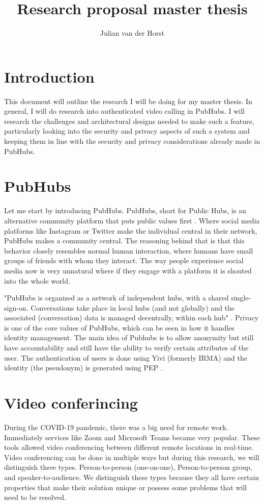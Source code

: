 \documentclass[11pt,a4paper]{article}
\title{Research proposal master thesis}
\author{Julian van der Horst}
\begin{document}
 
\maketitle
\section{Introduction}
This document will outline the research I will be doing for my master thesis. In general, I will do research into authenticated video calling in PubHubs. I will research the challenges and architectural designs needed to make such a feature, particularly looking into the security and privacy aspects of such a system and keeping them in line with the security and privacy considerations already made in PubHubs. 
\section{PubHubs}
Let me start by introducing PubHubs. PubHubs, short for Public Hubs, is an alternative community platform that puts public values first \cite{PH}. Where social media platforms like Instagram or Twitter make the individual central in their network, PubHubs makes a community central. The reasoning behind that is that this behavior closely resembles normal human interaction, where humans have small groups of friends with whom they interact. The way people experience social media now is very unnatural where if they engage with a platform it is shouted into the whole world.

"PubHubs is organized as a network of independent hubs, with a shared single-sign-on. Conversations take place in local hubs (and not globally) and the associated (conversation) data is managed decentrally, within each hub" \cite{PH}. Privacy is one of the core values of PubHubs, which can be seen in how it handles identity management. The main idea of Pubhubs is to allow anonymity but still have accountability and still have the ability to verify certain attributes of the user. The authentication of users is done using Yivi (formerly IRMA)\cite{YIVI} and the identity (the pseudonym) is generated using PEP \cite{PEP}.

\section{Video conferincing}
During the COVID-19 pandemic, there was a big need for remote work. Immediately services like Zoom \cite{Zoom} and Microsoft Teams \cite{MSTeams} became very popular. These tools allowed video conferencing between different remote locations in real-time. Video conferencing can be done in multiple ways but during this research, we will distinguish three types. Person-to-person (one-on-one), Person-to-person group, and speaker-to-audience. We distinguish these types because they all have certain properties that make their solution unique or possess some problems that will need to be resolved.
\end{document}
